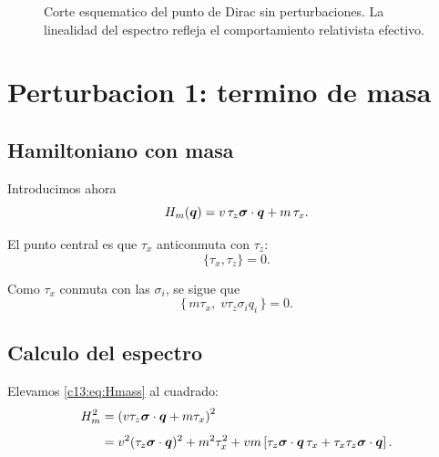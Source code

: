 \begin{figure}[ht]
\centering
{}
\caption{Corte esquematico del punto de Dirac sin perturbaciones. La linealidad del espectro refleja el comportamiento relativista efectivo.}
\label{c13:fig:dirac-clean}
\end{figure}

\section{Perturbacion 1: termino de masa}

\subsection{Hamiltoniano con masa}

Introducimos ahora
\begin{equation}
H_m(\bm{q})=v\,\tau_z \bm{\sigma}\cdot\bm{q} + m\,\tau_x.
\label{c13:eq:Hmass}
\end{equation}

El punto central es que \(\tau_x\) anticonmuta con \(\tau_z\):
\begin{equation}
\{\tau_x,\tau_z\}=0.
\end{equation}

Como \(\tau_x\) conmuta con las \(\sigma_i\), se sigue que
\begin{equation}
\{\,m\tau_x,\; v\tau_z \sigma_i q_i\,\}=0.
\end{equation}

\subsection{Calculo del espectro}

Elevamos \eqref{c13:eq:Hmass} al cuadrado:
\begin{align}
H_m^2
&=
\left(v\tau_z \bm{\sigma}\cdot\bm{q} + m\tau_x\right)^2
\nonumber\\[4pt]
&=
v^2(\tau_z \bm{\sigma}\cdot\bm{q})^2
+ m^2\tau_x^2
+ vm\left[\tau_z \bm{\sigma}\cdot\bm{q}\,\tau_x + \tau_x \tau_z \bm{\sigma}\cdot\bm{q}\right].
\end{align}

